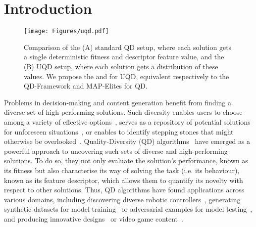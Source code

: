 \section{Introduction}

\begin{figure}[t!]
  \centering
  \texttt{[image: Figures/uqd.pdf]}
  \caption{
    Comparison of the (A) standard QD setup, where each solution gets a single deterministic fitness and descriptor feature value, and the (B) UQD setup, where each solution gets a distribution of these values. 
    We propose the \Longframework{} and \Longlongname{} for UQD, equivalent respectively to the QD-Framework and MAP-Elites for QD. 
  }
  \label{fig:uqd}
\end{figure}


Problems in decision-making and content generation benefit from finding a diverse set of high-performing solutions. Such diversity enables users to choose among a variety of effective options~\cite{map_elites}, serves as a repository of potential solutions for unforeseen situations~\cite{nature}, or enables to identify stepping stones that might otherwise be overlooked~\cite{novelty_search}. 
Quality-Diversity (QD) algorithms~\cite{pugh, book_chapter, framework} have emerged as a powerful approach to uncovering such sets of diverse and high-performing solutions. 
To do so, they not only evaluate the solution's performance, known as its fitness but also characterise its way of solving the task (i.e. its behaviour), known as its feature descriptor, which allows them to quantify its novelty with respect to other solutions.
Thus, QD algorithms have found applications across various domains, including discovering diverse robotic controllers~\cite{nature, huber2023quality}, generating synthetic datasets for model training~\cite{huber2024qdgset, gaier2024generative} or adversarial examples for model testing~\cite{samvelyan2024rainbow}, and producing innovative designs~\cite{gaier2017generative} or video game content~\cite{gravina, earle2022illuminating}. 


